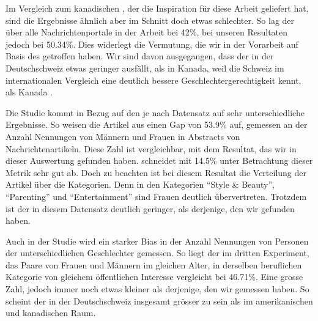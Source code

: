 Im Vergleich zum kanadischen  \cite{gender_gap_tracker}, der die Inspiration für diese Arbeit
geliefert hat, sind die Ergebnisse ähnlich aber im Schnitt doch etwas schlechter. So lag der 
über alle Nachrichtenportale in der Arbeit  bei 42\%, bei unseren Resultaten jedoch bei
50.34\%. Dies widerlegt die Vermutung, die wir in der Vorarbeit \cite{project2} auf Basis des 
\cite{gggr-20} getroffen haben. Wir sind davon ausgegangen, dass der  in der Deutschschweiz
etwas geringer ausfällt, als in Kanada, weil die Schweiz im internationalen Vergleich eine deutlich bessere
Geschlechtergerechtigkeit kennt, als Kanada \cite{gggr-20}.

Die Studie  \cite{does-gender-matter-in-the-news} kommt in Bezug
auf den  je nach Datensatz auf sehr unterschiedliche Ergebnisse. So weisen die Artikel aus 
einen Gap von 53.9\% auf, gemessen an der Anzahl Nennungen von Männern und Frauen in Abstracts von Nachrichtenartikeln.
Diese Zahl ist vergleichbar, mit dem Resultat, das wir in dieser Auswertung gefunden haben.
 schneidet mit 14.5\% unter Betrachtung dieser Metrik sehr gut ab. Doch zu beachten ist bei diesem Resultat die
Verteilung der Artikel über die Kategorien. Denn in den Kategorien \enquote{Style \& Beauty}, \enquote{Parenting} 
und \enquote{Entertainment} sind Frauen deutlich übervertreten. Trotzdem ist der  in diesem Datensatz
deutlich geringer, als derjenige, den wir gefunden haben.

Auch in der Studie  \cite{gender_bias_in_media} wird ein starker Bias in der Anzahl
Nennungen von Personen der unterschiedlichen Geschlechter gemessen. So liegt der  im dritten Experiment,
das Paare von Frauen und Männern im gleichen Alter, in derselben beruflichen Kategorie von gleichem öffentlichen Interesse vergleicht
bei 46.71\%. Eine grosse Zahl, jedoch immer noch etwas kleiner als derjenige, den wir gemessen haben. So scheint der
 in der Deutschschweiz insgesamt grösser zu sein als im amerikanischen und kanadischen Raum.

